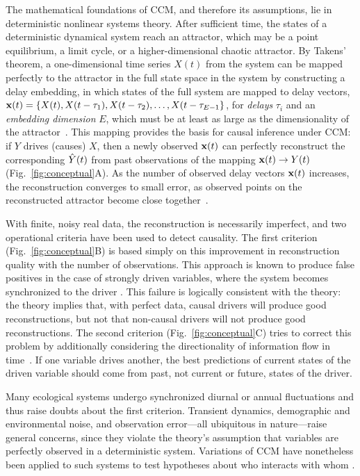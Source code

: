 The mathematical foundations of CCM, and therefore its assumptions, lie in deterministic nonlinear systems theory.
After sufficient time, the states of a deterministic dynamical system reach an attractor, which may be a point equilibrium, a limit cycle, or a higher-dimensional chaotic attractor.
By Takens' theorem, a one-dimensional time series $X(t)$ from the system can be mapped perfectly to the attractor in the full state space in the system by constructing a delay embedding, in which states of the full system are mapped to delay vectors, $\mathbf{x}(t) = \{X(t), X(t - \tau_1), X(t - \tau_2), \ldots, X(t - \tau_{E-1} \}$, for \emph{delays} $\tau_i$ and an \emph{embedding dimension} $E$, which must be at least as large as the dimensionality of the attractor~\cite{Takens1981}.
This mapping provides the basis for causal inference under CCM: if $Y$ drives (causes) $X$, then a newly observed $\mathbf{x}(t)$ can perfectly reconstruct the corresponding $\hat{Y}(t)$ from past observations of the mapping $\mathbf{x}(t) \rightarrow Y(t)$ (Fig.~\ref{fig:conceptual}A).
As the number of observed delay vectors $\mathbf{x}(t)$ increases, the reconstruction converges to small error, as observed points on the reconstructed attractor become close together~\cite{Sugihara2012}.

With finite, noisy real data, the reconstruction is necessarily imperfect, and two operational criteria have been used to detect causality.
The first criterion (Fig.~\ref{fig:conceptual}B) is based simply on this improvement in reconstruction quality with the number of observations.
This approach is known to produce false positives in the case of strongly driven variables, where the system becomes synchronized to the driver \cite{Sugihara2012, Kocarev1996}.
This failure is logically consistent with the theory: the theory implies that, with perfect data, causal drivers will produce good reconstructions, but not that non-causal drivers will not produce good reconstructions.
The second criterion (Fig.~\ref{fig:conceptual}C) tries to correct this problem by additionally considering the directionality of information flow in time~\cite{Ye2015}.
If one variable drives another, the best predictions of current states of the driven variable should come from past, not current or future, states of the driver.

Many ecological systems undergo synchronized diurnal or annual fluctuations and thus raise doubts about the first criterion.
Transient dynamics, demographic and environmental noise, and observation error---all ubiquitous in nature---raise general concerns, since they violate the theory's assumption that variables are perfectly observed in a deterministic system.
Variations of CCM have nonetheless been applied to such systems to test hypotheses about who interacts with whom \cite{Ye2015, Sugihara2012, Tajima2015, Tsonis2015, Clark2015}.

